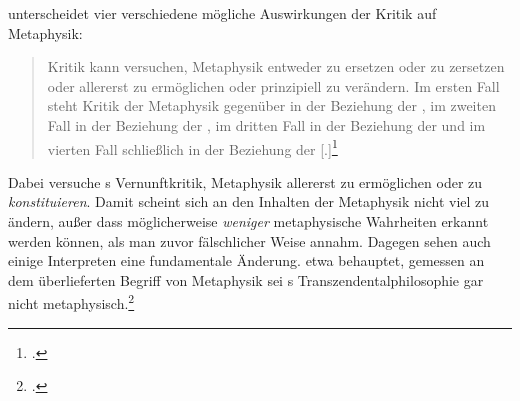 unterscheidet vier verschiedene mögliche Auswirkungen der Kritik auf
Metaphysik:
\begin{quote}
Kritik kann versuchen, Metaphysik \punkt
 entweder zu ersetzen \punkt
 oder zu zersetzen \punkt
 oder allererst zu ermöglichen \punkt
 oder prinzipiell zu verändern.
Im ersten Fall steht Kritik der Metaphysik gegenüber in der
Beziehung der , im zweiten Fall in der Beziehung der , im dritten Fall
in der Beziehung der  und im vierten Fall schließlich in der
Beziehung der [.]\footnote{\cite[][292]{Beckmann:ZurTransformationvonMetaphysikdurchKritik1985}.}
\end{quote}
Dabei versuche s Vernunftkritik, Metaphysik
allererst zu ermöglichen oder zu \emph{konstituieren}. Damit scheint sich an den Inhalten der
Metaphysik nicht viel zu ändern, außer dass möglicherweise \emph{weniger}
metaphysische Wahrheiten erkannt werden können, als man zuvor fälschlicher Weise
annahm. Dagegen sehen auch einige Interpreten eine fundamentale Änderung.
 etwa behauptet, gemessen
an dem überlieferten Begriff von Metaphysik sei s
Transzendentalphilosophie gar nicht
metaphysisch.\footcite[Vgl.][\pno~416\,f.]{Hoeffe:EthikohneundmitMetaphysik2007}
